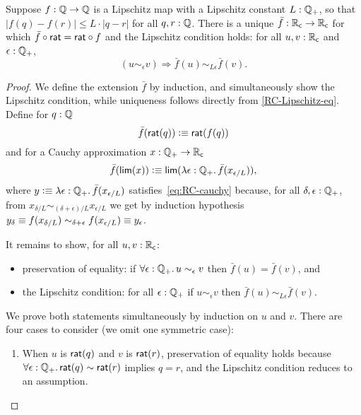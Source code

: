 \begin{lem}\label{RC-extend-Q-Lipschitz}
  Suppose $f : \mathbb{Q} \to \mathbb{Q}$ is a Lipschitz map with a Lipschitz constant $L : \mathbb{Q}_{+}$, so that
  $|f(q) - f(r)| \leq L \cdot |q - r|$ for all $q, r : \mathbb{Q}$. There is a unique $\bar{f} :
  \mathbb{R}_\mathsf{c} \to \mathbb{R}_\mathsf{c}$ for which $\bar{f} \circ \mathsf{rat} = \mathsf{rat} \circ f$ and the Lipschitz
  condition holds: for all $u, v : \mathbb{R}_\mathsf{c}$ and $\epsilon : \mathbb{Q}_{+}$,
  \begin{equation*}
    (u \sim_\epsilon v) \Rightarrow \bar{f}(u) \sim_{L \epsilon} \bar{f}(v).
  \end{equation*}
\end{lem}

\begin{proof}
  We define the extension $\bar{f}$ by induction, and simultaneously show the Lipschitz
  condition, while uniqueness follows directly from \autoref{RC-Lipschitz-eq}. Define for
  $q : \mathbb{Q}$
  \begin{equation*}
    \bar{f}(\mathsf{rat}(q)) \vcentcolon\equiv \mathsf{rat}(f(q))
  \end{equation*}
  and for a Cauchy approximation $x : \mathbb{Q}_{+} \to \mathbb{R}_\mathsf{c}$
  \begin{equation*}
    \bar{f}(\rclim(x)) \defeq \rclim(\lam{\epsilon : \Qp} \bar{f}(x_{\epsilon/L})),
  \end{equation*}
  where $y \defeq \lam{\epsilon : \Qp} \bar{f}(x_{\epsilon/L})$
  satisfies~\eqref{eq:RC-cauchy} because, for all $\delta, \epsilon : \mathbb{Q}_{+}$, from
  $x_{\delta/L} \sim_{(\delta + \epsilon)/L} x_{\epsilon/L}$ we get by induction
  hypothesis $y_\delta \equiv f(x_{\delta/L}) \sim_{\delta + \epsilon} f(x_{\epsilon/L})
  \equiv y_\epsilon$.

  It remains to show, for all $u, v : \mathbb{R}_\mathsf{c}$:
  \begin{itemize}
  \item preservation of equality: if $\fall{\epsilon : \Qp} u \sim_\epsilon v$ then
    $\bar{f}(u) = \bar{f}(v)$, and
  \item the Lipschitz condition: for all $\epsilon : \mathbb{Q}_{+}$ if $u \sim_\epsilon v$ then
    $\bar{f}(u) \sim_{L \epsilon} \bar{f}(v)$.
  \end{itemize}
  We prove both statements simultaneously by induction on $u$ and $v$. There are four
  cases to consider (we omit one symmetric case):
  \begin{enumerate}

  \item When $u$ is $\mathsf{rat}(q)$ and $v$ is $\mathsf{rat}(r)$, preservation of equality holds because
    $\fall{\epsilon : \Qp} \rcrat(q) \sim \rcrat(r)$ implies $q = r$, and the Lipschitz condition
    reduces to an assumption.


\end{enumerate}
\end{proof}
